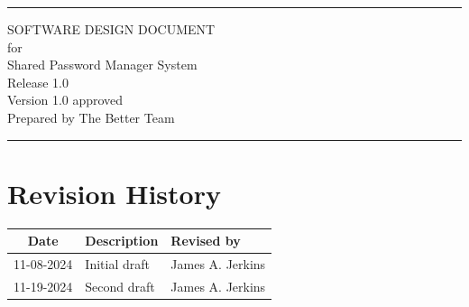 \documentclass[letterpaper,12pt,oneside,listof=totoc]{scrreprt}
\date{\today}
\author{} %
\def\myversion{1.0 }
\begin{document}
\begin{titlepage}
\flushright
\rule{\textwidth}{5pt}\vskip1cm
\Huge{SOFTWARE DESIGN DOCUMENT}\\
\vspace{1.5cm}
for\\
\vspace{1.5cm}
Shared Password Manager System\\                      %
\vspace{1.5cm}
\LARGE{Release 1.0\\}
\vspace{1.5cm}
\LARGE{Version \myversion approved\\}
\vspace{1.5cm}
Prepared by The Better Team\\
\vfill
\rule{\textwidth}{5pt}
\end{titlepage}
\tableofcontents
\listoffigures
\listoftables

\chapter*{Revision History}

\begin{tabular}{| c | p{} | p{} |}
\hline
Date     & Description   & Revised by \\
\hline
11-08-2024 & Initial draft & James A. Jerkins \\
11-19-2024 & Second draft & James A. Jerkins \\
\hline
\end{tabular}

%
%
%
\end{document}
